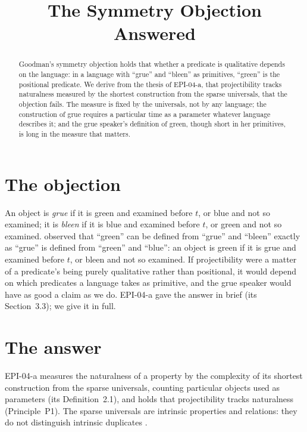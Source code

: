 \documentclass{situationist-preprint}
\title{The Symmetry Objection Answered}
\begin{document}
\maketitle

\begin{abstract}
Goodman's symmetry objection holds that whether a predicate is qualitative depends on the language: in a language with \enquote{grue} and \enquote{bleen} as primitives, \enquote{green} is the positional predicate. We derive from the thesis of EPI-04-a, that projectibility tracks naturalness measured by the shortest construction from the sparse universals, that the objection fails. The measure is fixed by the universals, not by any language; the construction of grue requires a particular time as a parameter whatever language describes it; and the grue speaker's definition of green, though short in her primitives, is long in the measure that matters.
\end{abstract}

\section{The objection}

An object is \emph{grue} if it is green and examined before $t$, or blue and not so examined; it is \emph{bleen} if it is blue and examined before $t$, or green and not so examined. \citet[ch.~3]{Goodman1955} observed that \enquote{green} can be defined from \enquote{grue} and \enquote{bleen} exactly as \enquote{grue} is defined from \enquote{green} and \enquote{blue}: an object is green if it is grue and examined before $t$, or bleen and not so examined. If projectibility were a matter of a predicate's being purely qualitative rather than positional, it would depend on which predicates a language takes as primitive, and the grue speaker would have as good a claim as we do. EPI-04-a gave the answer in brief (its Section~3.3); we give it in full.

\section{The answer}

EPI-04-a measures the naturalness of a property by the complexity of its shortest construction from the sparse universals, counting particular objects used as parameters (its Definition~2.1), and holds that projectibility tracks naturalness (Principle~P1). The sparse universals are intrinsic properties and relations: they do not distinguish intrinsic duplicates \citep{Lewis1983}.
\end{document}
